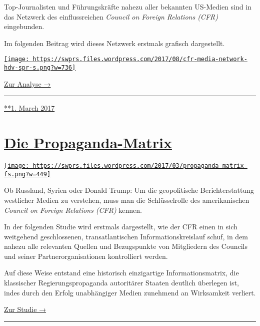 Top-Journalisten und Führungskräfte nahezu aller bekannten US-Medien
sind in das Netz­werk des einflussreichen \emph{Council on Foreign
Relations (CFR)} eingebunden.

Im folgenden Beitrag wird dieses Netzwerk erstmals grafisch
dar­ge­stellt.

\href{https://swprs.org/das-american-empire-und-seine-medien/}{\texttt{[image: https://swprs.files.wordpress.com/2017/08/cfr-media-network-hdv-spr-s.png?w=736]}}

\href{https://swprs.org/das-american-empire-und-seine-medien/}{Zur
Analyse →}

\begin{center}\rule{0.5\linewidth}{\linethickness}\end{center}

\href{https://swprs.org/2017/03/01/netzwerk-medien-usa/}{**1. March
2017}

\hypertarget{die-propaganda-matrix}{%
\section{\texorpdfstring{\href{https://swprs.org/2017/03/01/propaganda-matrix/}{Die
Propaganda-Matrix}}{Die Propaganda-Matrix}}\label{die-propaganda-matrix}}

\href{https://swprs.org/2017/03/01/propaganda-matrix/}{\texttt{[image: https://swprs.files.wordpress.com/2017/03/propaganda-matrix-fs.png?w=449]}}

Ob Russland, Syrien oder Donald Trump: Um die geopolitische
Bericht­erstattung westlicher Medien zu verstehen, muss man die
Schlüssel­rolle des amerikanischen \emph{Council on Foreign Relations
(CFR)} kennen.

In der folgenden Studie wird erstmals dargestellt, wie der CFR einen in
sich weitgehend geschlossenen, trans­atlantischen
Informations­­kreislauf schuf, in dem nahezu alle relevanten Quellen und
Bezugs­punkte von Mitgliedern des Councils und seiner
Partner­­organisationen kontrolliert werden.

Auf diese Weise entstand eine historisch einzigartige
Informations­­matrix, die klassischer Regierungs­propaganda autoritärer
Staaten deutlich überlegen ist, indes durch den Erfolg unabhängiger
Medien zunehmend an Wirksamkeit verliert.

\href{https://swprs.org/die-propaganda-matrix}{Zur Studie →}

\begin{center}\rule{0.5\linewidth}{\linethickness}\end{center}

